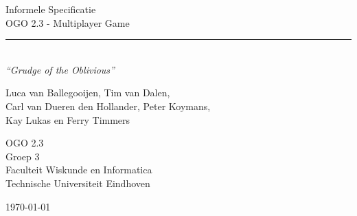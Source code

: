 \begin{titlepage}
	\begin{center}
		
		{\Huge Informele Specificatie \\[0.5cm]OGO 2.3 - Multiplayer Game}\\[0.5cm]
		\rule{\linewidth}{0.5mm}\\[0.5cm]
				\bigskip
		\huge \textit{``Grudge of the Oblivious''}
		
		{\Large
		Luca van Ballegooijen, Tim van Dalen, \\
		Carl van Dueren den Hollander, Peter Koymans,\\
		Kay Lukas en Ferry Timmers\\[1cm]
		}
		
		{\large
		OGO 2.3\\
		Groep 3 \\[1cm]
		Faculteit Wiskunde en Informatica\\
		Technische Universiteit Eindhoven\\[1cm]
		}
		
		

		\vfill

		{\large \today}
	\end{center}
\end{titlepage}
